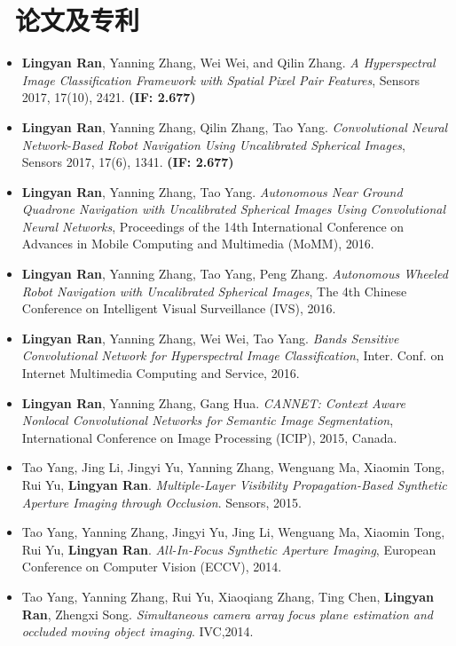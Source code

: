 \documentclass{resume}
\begin{document}
\section{\faFile\ 论文及专利}
\begin{itemize}
	\item \textbf{Lingyan Ran}, Yanning Zhang, Wei Wei, and Qilin Zhang. \textit{A Hyperspectral Image Classification Framework with Spatial Pixel Pair Features}, Sensors 2017, 17(10), 2421. \textbf{(IF: 2.677)}
	\item \textbf{Lingyan Ran}, Yanning Zhang, Qilin Zhang, Tao Yang. \textit{Convolutional Neural Network-Based Robot Navigation Using Uncalibrated Spherical Images}, Sensors 2017, 17(6), 1341. \textbf{(IF: 2.677)}
	\item \textbf{Lingyan Ran}, Yanning Zhang, Tao Yang. \textit{Autonomous Near Ground Quadrone Navigation
 with Uncalibrated Spherical Images Using Convolutional Neural Networks}, Proceedings of the 14th International Conference on Advances in Mobile Computing and Multimedia (MoMM), 2016.
  \item \textbf{Lingyan Ran}, Yanning Zhang, Tao Yang, Peng Zhang. \textit{Autonomous Wheeled Robot Navigation with Uncalibrated Spherical Images}, The 4th Chinese Conference on Intelligent Visual Surveillance (IVS), 2016.
  \item \textbf{Lingyan Ran}, Yanning Zhang, Wei Wei, Tao Yang. \textit{Bands Sensitive Convolutional Network for Hyperspectral Image Classification}, Inter. Conf. on Internet Multimedia Computing and Service, 2016.
  \item \textbf{Lingyan Ran}, Yanning Zhang, Gang Hua. \textit{CANNET: Context Aware Nonlocal Convolutional Networks for Semantic Image Segmentation}, International Conference on Image Processing (ICIP), 2015, Canada. %
  \item Tao Yang, Jing Li, Jingyi Yu, Yanning Zhang, Wenguang Ma, Xiaomin Tong, Rui Yu, \textbf{Lingyan Ran}. \textit{Multiple-Layer Visibility Propagation-Based Synthetic Aperture Imaging through Occlusion}. Sensors, 2015. %
  \item Tao Yang, Yanning Zhang, Jingyi Yu, Jing Li, Wenguang Ma, Xiaomin Tong, Rui Yu, \textbf{Lingyan Ran}. \textit{All-In-Focus Synthetic Aperture Imaging}, European Conference on Computer Vision (ECCV), 2014.
  \item Tao Yang, Yanning Zhang, Rui Yu, Xiaoqiang Zhang, Ting Chen, \textbf{Lingyan Ran}, Zhengxi Song. \textit{Simultaneous camera array focus plane estimation and occluded moving object imaging}. IVC,2014.

\end{itemize}
\end{document}
